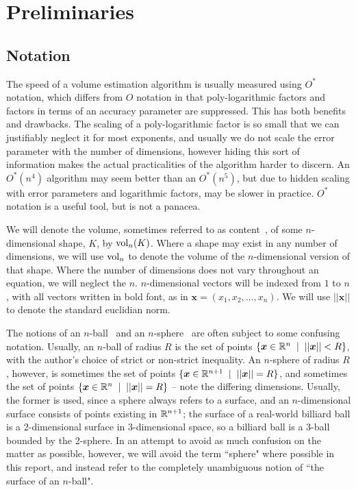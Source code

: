 \section{Preliminaries}
\subsection{Notation}

The speed of a volume estimation algorithm is usually measured using $O^{*}$ notation, which differs from $O$ notation in that poly-logarithmic factors and factors in terms of an accuracy parameter are suppressed. This has both benefits and drawbacks. The scaling of a poly-logarithmic factor is so small that we can justifiably neglect it for most exponents, and usually we do not scale the error parameter with the number of dimensions, however hiding this sort of information makes the actual practicalities of the algorithm harder to discern. An $O^{*}(n^4)$ algorithm may seem better than an $O^{*}(n^5)$, but due to hidden scaling with error parameters and logarithmic factors, may be slower in practice. $O^{*}$ notation is a useful tool, but is not a panacea.

We will denote the volume, sometimes referred to as content~\cite{mathworld_content}, of some $n$-dimensional shape, $K$, by $\mbox{vol}_n(K)$. Where a shape may exist in any number of dimensions, we will use $\mbox{vol}_n$ to denote the volume of the $n$-dimensional version of that shape. Where the number of dimensions does not vary throughout an equation, we will neglect the $n$. $n$-dimensional vectors will be indexed from $1$ to $n$, with all vectors written in bold font, as in ${\bm x} = (x_1, x_2, ..., x_n)$. We will use $||\bm{x}||$ to denote the standard euclidian norm.

The notions of an $n$-ball~\cite{mathworld_ball} and an $n$-sphere~\cite{mathworld_sphere} are often subject to some confusing notation. Usually, an $n$-ball of radius $R$ is the set of points $\{{\bm x} \in \mathbb{R}^n  \;\; | \;\; ||\bm{x}|| < R \}$, with the author's choice of strict or non-strict inequality. An $n$-sphere of radius $R$, however, is sometimes the set of points $\{{\bm x} \in \mathbb{R}^{n+1}  \;\; | \;\; ||\bm{x}|| = R \}$, and sometimes the set of points $\{{\bm x} \in \mathbb{R}^{n}  \;\; | \;\; ||\bm{x}|| = R \}$ -- note the differing dimensions. Usually, the former is used, since a sphere always refers to a surface, and an $n$-dimensional surface consists of points existing in $\mathbb{R}^{n+1}$; the surface of a real-world billiard ball is a 2-dimensional surface in 3-dimensional space, so a billiard ball is a 3-ball bounded by the 2-sphere. In an attempt to avoid as much confusion on the matter as possible, however, we will avoid the term ``sphere" where possible in this report, and instead refer to the completely unambiguous notion of ``the surface of an $n$-ball".

